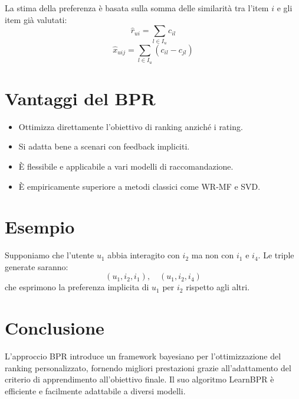 \documentclass{article}
\begin{document}
La stima della preferenza è basata sulla somma delle similarità tra l’item $i$ e gli item già valutati:
\[
\hat{r}_{ui} = \sum_{l \in I_u} c_{il}
\]
\[
\hat{x}_{uij} = \sum_{l \in I_u} (c_{il} - c_{jl})
\]

\section{Vantaggi del BPR}

\begin{itemize}
    \item Ottimizza direttamente l'obiettivo di ranking anziché i rating.
    \item Si adatta bene a scenari con feedback impliciti.
    \item È flessibile e applicabile a vari modelli di raccomandazione.
    \item È empiricamente superiore a metodi classici come WR-MF e SVD.
\end{itemize}

\section{Esempio}

Supponiamo che l’utente $u_1$ abbia interagito con $i_2$ ma non con $i_1$ e $i_4$. Le triple generate saranno:
\[
(u_1, i_2, i_1), \quad (u_1, i_2, i_4)
\]
che esprimono la preferenza implicita di $u_1$ per $i_2$ rispetto agli altri.

\section{Conclusione}

L’approccio BPR introduce un framework bayesiano per l’ottimizzazione del ranking personalizzato, fornendo migliori prestazioni grazie all’adattamento del criterio di apprendimento all’obiettivo finale. Il suo algoritmo LearnBPR è efficiente e facilmente adattabile a diversi modelli.





\end{document}
